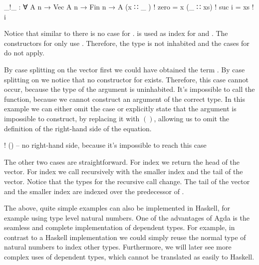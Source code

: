 \begin{AgdaAlign}
\begin{code}
_!_ : ∀ {A n} → Vec A n → Fin n → A
(x  ∷ _ )  ! zero   = x
(_  ∷ xs)  ! suc i  = xs ! i
\end{code}
Notice that similar to  there is no case for
\AgdaInductiveConstructor{[]}.
 is used as index for
\AgdaSpace{} and .
The constructors for  only use .
Therefore, the type
\AgdaSpace{}
is not inhabited and the cases for \AgdaInductiveConstructor{[]} do not apply.

By case splitting on the vector first we could have obtained the term
\AgdaInductiveConstructor{[]}\AgdaSpace{}\AgdaFunction{!}\AgdaSpace{}.
By case splitting on  we notice that no constructor for
 exists.
Therefore, this case cannot occur, because the type of the argument is
uninhabited.
It's impossible to call the function, because we cannot construct an argument of
the correct type.
In this example we can either omit the case or explicitly state that the
argument is impossible to construct, by replacing it with $()$, allowing us to
omit the definition of the right-hand side of the equation.

\begin{code}
[]         ! () -- no right-hand side, because it's impossible to reach this case
\end{code}
\end{AgdaAlign}
The other two cases are straightforward.
For index  we return the head of the vector.
For index \AgdaSpace{} we call
\AgdaFunction{\_!\_} recursively with the smaller index and the tail of the
vector.
Notice that the types for the recursive call change.
The tail of the vector  and the smaller index 
are indexed over the predecessor of .

The above, quite simple examples can also be implemented in Haskell, for
example using type level natural numbers.
One of the advantages of Agda is the seamless and complete implementation of
dependent types.
For example, in contrast to a Haskell implementation we could simply reuse the
normal type of natural numbers to index other types.
Furthermore, we will later see more complex uses of dependent types, which
cannot be translated as easily to Haskell.


